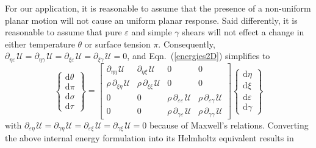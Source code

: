 For our application, it is reasonable to assume that the presence of a non-uniform planar motion will not cause an uniform planar response.  Said differently, it is reasonable to assume that pure $\varepsilon$ and simple $\gamma$ shears will not effect a change in either temperature $\theta$ or surface tension $\pi$.  Consequently, $\partial_{\eta\varepsilon\,} \mathcal{U} = \partial_{\eta\gamma\,} \mathcal{U} = \partial_{\xi\varepsilon\,} \mathcal{U} = \partial_{\xi\gamma\,} \mathcal{U} = 0$, and Eqn.~(\ref{energies2D}) simplifies to
\begin{displaymath}
\left\{ \begin{matrix}
\mathrm{d} \theta \\ \mathrm{d} \pi \\
\mathrm{d} \sigma \\ \mathrm{d} \tau
\end{matrix} \right\} = \begin{bmatrix}
\partial_{\eta\eta\,} \mathcal{U} & 
\partial_{\eta\xi\,} \mathcal{U} & 
0 & 0 \\ 
\rho \, \partial_{\xi\eta\,} \mathcal{U} & 
\rho \, \partial_{\xi\xi\,} \mathcal{U} & 
0 & 0 \\
0 & 0 & 
\rho \, \partial_{\varepsilon\varepsilon\,} \mathcal{U} & 
\rho \, \partial_{\varepsilon\gamma\,} \mathcal{U} \\
0 & 0 & 
\rho \, \partial_{\gamma\varepsilon\,} \mathcal{U} & 
\rho \, \partial_{\gamma\gamma\,} \mathcal{U} 
\end{bmatrix} 
\left\{ \begin{matrix}
\mathrm{d}\eta \\ \mathrm{d} \xi \\
\mathrm{d} \varepsilon \\ \mathrm{d} \gamma
\end{matrix} \right\} 
\end{displaymath}
with $\partial_{\varepsilon\eta\,} \mathcal{U} = \partial_{\gamma\eta\,} \mathcal{U} = \partial_{\varepsilon\xi\,} \mathcal{U} = \partial_{\gamma\xi\,} \mathcal{U} = 0$
because of Maxwell's relations.  Converting the above internal energy formulation into its Helmholtz equivalent results in

